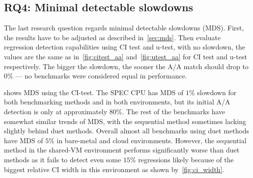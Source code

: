 \subsection{RQ4: Minimal detectable slowdowns}
\label{sec:rq4}

The last research question regards minimal detectable slowdowns (MDS).
First, the results have to be adjusted as described in~\cref{sec:mds}.
Then evaluate regression detection capabilities using CI test and \mbox{u-test}, with no slowdown, the values are the same as in~\cref{fig:citest_aa} and~\cref{fig:utest_aa} for CI test and \mbox{u-test} respectively.
The bigger the slowdown, the sooner the A/A match should drop to $0\%$ --- no benchmarks were considered equal in performance.

 shows MDS using the CI-test.
The SPEC CPU has MDS of $1\%$ slowdown for both benchmarking methods and in both environments, but its initial A/A detection is only at approximately $80\%$.
The rest of the benchmarks have somewhat similar trends of MDS, with the sequential method sometimes lacking slightly behind duet methods.
Overall almost all benchmarks using duet methods have MDS of $5\%$ in bare-metal and cloud environments.
However, the sequential method in the \mbox{shared-VM} environment performs significantly worse than duet methods as it fails to detect even some $15\%$ regressions likely because of the biggest relative CI width in this environment as shown by~\cref{fig:ci_width}.

